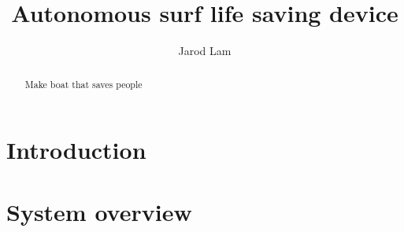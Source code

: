 \documentclass[a4paper]{IEEEtran}
\title{Autonomous surf life saving device}
\author{Jarod Lam}
\begin{document}
\maketitle

\begin{abstract}
Make boat that saves people
\end{abstract}

\section{Introduction}

\section{System overview}
\end{document}
